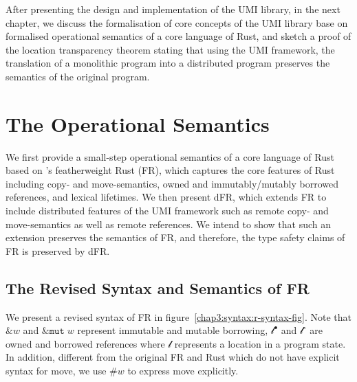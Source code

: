 After presenting the design and implementation of the UMI library, in the next chapter, we discuss the formalisation of core concepts of the UMI library base on formalised operational semantics of a core language of Rust, and sketch a proof of the location transparency theorem stating that using the UMI framework, the translation of a monolithic program into a distributed program preserves the semantics of the original program.

\section{The Operational Semantics}
\label{chap3:semantics}
We first provide a small-step operational semantics of a core language of Rust based on \citet{10.1145/3443420}'s featherweight Rust (FR), which captures the core features of Rust including copy- and move-semantics, owned and immutably/mutably borrowed references, and lexical lifetimes. We then present dFR, which extends FR to include distributed features of the UMI framework such as remote copy- and move-semantics as well as remote references. We intend to show that such an extension preserves the semantics of FR, and therefore, the type safety claims of FR is preserved by dFR.

\subsection{The Revised Syntax and Semantics of FR}
\label{chap3:semantics:fr}
We present a revised syntax of FR in figure~\ref{chap3:syntax:r-syntax-fig}. Note that $\&w$ and $\&\texttt{mut}\;w$ represent immutable and mutable borrowing, $\mathscr{l}^\bullet$ and $\mathscr{l}^\circ$ are owned and borrowed references where $\mathscr{l}$ represents a location in a program state. In addition, different from the original FR and Rust which do not have explicit syntax for move, we use $\#w$ to express move explicitly.

